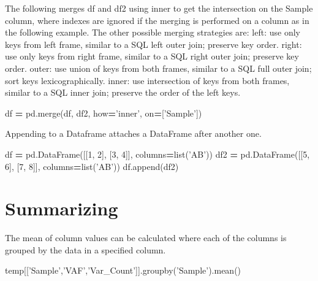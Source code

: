 \documentclass[]{book}
\newenvironment{Shaded}{\begin{snugshade}}{\end{snugshade}}
\newcommand{\BuiltInTok}[1]{#1}
\newcommand{\DecValTok}[1]{\textcolor[rgb]{0.00,0.00,0.81}{#1}}
\newcommand{\NormalTok}[1]{#1}
\newcommand{\OperatorTok}[1]{\textcolor[rgb]{0.81,0.36,0.00}{\textbf{#1}}}
\newcommand{\StringTok}[1]{\textcolor[rgb]{0.31,0.60,0.02}{#1}}
\begin{document}
The following merges df and df2 using inner to get the intersection on the Sample column, where indexes are ignored if the merging is performed on a column as in the following example.
The other possible merging strategies are:
left: use only keys from left frame, similar to a SQL left outer join; preserve key order.
right: use only keys from right frame, similar to a SQL right outer join; preserve key order.
outer: use union of keys from both frames, similar to a SQL full outer join; sort keys lexicographically.
inner: use intersection of keys from both frames, similar to a SQL inner join; preserve the order of the left keys.

\begin{Shaded}
\begin{Highlighting}[]
\NormalTok{df }\OperatorTok{=}\NormalTok{ pd.merge(df, df2, how}\OperatorTok{=}\StringTok{'inner'}\NormalTok{, on}\OperatorTok{=}\NormalTok{[}\StringTok{'Sample'}\NormalTok{])}
\end{Highlighting}
\end{Shaded}

Appending to a Dataframe attaches a DataFrame after another one.

\begin{Shaded}
\begin{Highlighting}[]
\NormalTok{df }\OperatorTok{=}\NormalTok{ pd.DataFrame([[}\DecValTok{1}\NormalTok{, }\DecValTok{2}\NormalTok{], [}\DecValTok{3}\NormalTok{, }\DecValTok{4}\NormalTok{]], columns}\OperatorTok{=}\BuiltInTok{list}\NormalTok{(}\StringTok{'AB'}\NormalTok{))}
\NormalTok{df2 }\OperatorTok{=}\NormalTok{ pd.DataFrame([[}\DecValTok{5}\NormalTok{, }\DecValTok{6}\NormalTok{], [}\DecValTok{7}\NormalTok{, }\DecValTok{8}\NormalTok{]], columns}\OperatorTok{=}\BuiltInTok{list}\NormalTok{(}\StringTok{'AB'}\NormalTok{))}
\NormalTok{df.append(df2)}
\end{Highlighting}
\end{Shaded}

\hypertarget{summarizing}{%
\section{Summarizing}\label{summarizing}}

The mean of column values can be calculated where each of the columns is grouped by the data in a specified column.

\begin{Shaded}
\begin{Highlighting}[]
\NormalTok{temp[[}\StringTok{'Sample'}\NormalTok{,}\StringTok{'VAF'}\NormalTok{,}\StringTok{'Var_Count'}\NormalTok{]].groupby(}\StringTok{'Sample'}\NormalTok{).mean()}
\end{Highlighting}
\end{Shaded}
\end{document}
